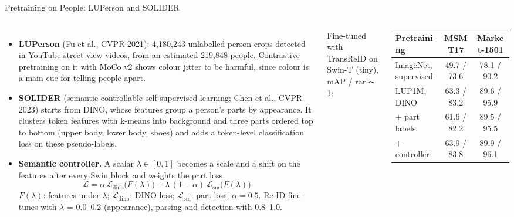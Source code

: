 \begin{frame}{Pretraining on People: LUPerson and SOLIDER}
  \begin{columns}[T,onlytextwidth]
      \begin{itemize}\scriptsize\itemsep0.2em
        \item \textbf{LUPerson} (Fu et al., CVPR 2021): 4,180,243 unlabelled person crops detected in YouTube street-view videos, from an estimated 219,848 people. Contrastive pretraining on it with MoCo v2 shows colour jitter to be harmful, since colour is a main cue for telling people apart.
        \item \textbf{SOLIDER} (semantic controllable self-supervised learning; Chen et al., CVPR 2023) starts from DINO, whose features group a person's parts by appearance. It clusters token features with k-means into background and three parts ordered top to bottom (upper body, lower body, shoes) and adds a token-level classification loss on these pseudo-labels.
        \item \textbf{Semantic controller.} A scalar $\lambda\in[0,1]$ becomes a scale and a shift on the features after every Swin block and weights the part loss:
        \[ \mathcal{L} = \alpha\,\mathcal{L}_{\mathrm{dino}}\big(F(\lambda)\big) + \lambda\,(1-\alpha)\,\mathcal{L}_{\mathrm{sm}}\big(F(\lambda)\big) \]
        $F(\lambda)$: features under $\lambda$; $\mathcal{L}_{\mathrm{dino}}$: DINO loss; $\mathcal{L}_{\mathrm{sm}}$: part loss; $\alpha=0.5$. Re-ID fine-tunes with $\lambda$ = 0.0--0.2 (appearance), parsing and detection with 0.8--1.0.
      \end{itemize}
      \centering
      {\scriptsize Fine-tuned with TransReID on Swin-T (tiny), mAP / rank-1:\par}
      \vspace{0.3em}
      {\scriptsize
      \begin{tabular}{lcc}
        \toprule
        \textbf{Pretraining} & \textbf{MSMT17} & \textbf{Market-1501} \\
        \midrule
        ImageNet, supervised & 49.7 / 73.6 & 78.1 / 90.2 \\
        LUP1M, DINO & 63.3 / 83.2 & 89.6 / 95.9 \\
        \quad + part labels & 61.6 / 82.2 & 89.5 / 95.5 \\
        \quad + controller & 63.9 / 83.8 & 89.9 / 96.1 \\
        \bottomrule
      \end{tabular}\par}

\end{columns}
\end{frame}
